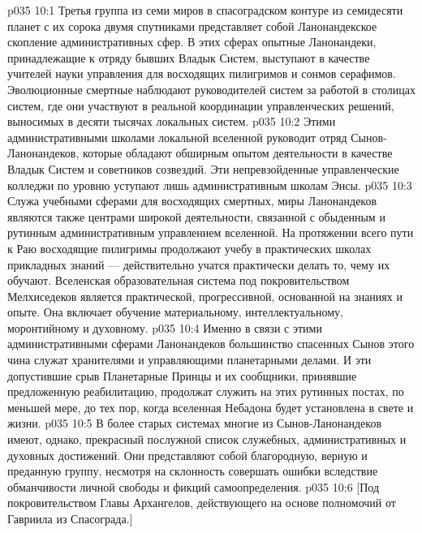 \vs p035 10:1 Третья группа из семи миров в спасоградском контуре из семидесяти планет с их сорока двумя спутниками представляет собой Ланонандекское скопление административных сфер. В этих сферах опытные Ланонандеки, принадлежащие к отряду бывших Владык Систем, выступают в качестве учителей науки управления для восходящих пилигримов и сонмов серафимов. Эволюционные смертные наблюдают руководителей систем за работой в столицах систем, где они участвуют в реальной координации управленческих решений, выносимых в десяти тысячах локальных систем.
\vs p035 10:2 Этими административными школами локальной вселенной руководит отряд Сынов\hyp{}Ланонандеков, которые обладают обширным опытом деятельности в качестве Владык Систем и советников созвездий. Эти непревзойденные управленческие колледжи по уровню уступают лишь административным школам Энсы.
\vs p035 10:3 Служа учебными сферами для восходящих смертных, миры Ланонандеков являются также центрами широкой деятельности, связанной с обыденным и рутинным административным управлением вселенной. На протяжении всего пути к Раю восходящие пилигримы продолжают учебу в практических школах прикладных знаний --- действительно учатся практически делать то, чему их обучают. Вселенская образовательная система под покровительством Мелхиседеков является практической, прогрессивной, основанной на знаниях и опыте. Она включает обучение материальному, интеллектуальному, моронтийному и духовному.
\vs p035 10:4 \pc Именно в связи с этими административными сферами Ланонандеков большинство спасенных Сынов этого чина служат хранителями и управляющими планетарными делами. И эти допустившие срыв Планетарные Принцы и их сообщники, принявшие предложенную реабилитацию, продолжат служить на этих рутинных постах, по меньшей мере, до тех пор, когда вселенная Небадона будет установлена в свете и жизни.
\vs p035 10:5 \pc В более старых системах многие из Сынов\hyp{}Ланонандеков имеют, однако, прекрасный послужной список служебных, административных и духовных достижений. Они представляют собой благородную, верную и преданную группу, несмотря на склонность совершать ошибки вследствие обманчивости личной свободы и фикций самоопределения.
\vsetoff
\vs p035 10:6 [Под покровительством Главы Архангелов, действующего на основе полномочий от Гавриила из Спасограда.]
